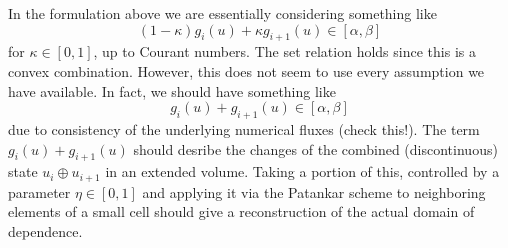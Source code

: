 \documentclass[]{article}
\begin{document}
In the formulation above we are essentially considering something like
\begin{displaymath}
(1-\kappa)g_i(u) + \kappa g_{i+1}(u) \in [\alpha, \beta]
\end{displaymath}
for $\kappa \in [0, 1]$, up to Courant numbers. The set relation holds since this is a convex combination. However, this does not seem to use every assumption we have available. In fact, we should have something like
\begin{displaymath}
	g_i(u) + g_{i+1}(u) \in [\alpha, \beta]
\end{displaymath}
due to consistency of the underlying numerical fluxes (check this!). The term $g_i(u) + g_{i+1}(u)$ should desribe  the changes of the combined (discontinuous) state $u_i \oplus u_{i+1}$ in an extended volume. Taking a portion of this, controlled by a parameter $\eta \in [0, 1]$ and applying it via the Patankar scheme to neighboring elements of a small cell should give a reconstruction of the actual domain of dependence.
\end{document}
